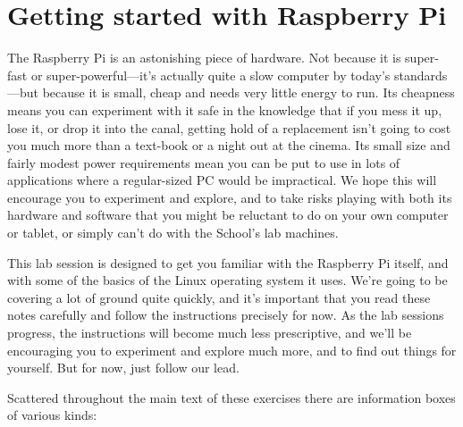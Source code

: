 \chapter{Getting started with Raspberry Pi}



The Raspberry Pi is an astonishing piece of hardware. Not because it is super-fast or super-powerful---it's actually quite a slow computer by today's standards---but because it is small, cheap and needs very little energy to run. Its cheapness means you can experiment with it safe in the knowledge that if you mess it up, lose it, or drop it into the canal, getting hold of a replacement isn't going to cost you much more than a text-book or a night out at the cinema. Its small size and fairly modest power requirements mean you can be put to use in lots of applications where a regular-sized PC would be impractical.  We hope this will encourage you to experiment and explore, and to take risks playing with both its hardware and software that you might be reluctant to do on your own computer or tablet, or simply can't do with the School's lab machines. 

This lab session is designed to get you familiar with the Raspberry Pi itself, and with some of the basics of the Linux operating system it uses. We're going to be covering a lot of ground quite quickly, and it's important that you read these notes carefully and follow the instructions precisely for now. As the lab sessions progress, the instructions will become much less prescriptive, and we'll be encouraging you to experiment and explore much more, and to find out things for yourself. But for now, just follow our lead. 

Scattered throughout the main text of these exercises there are information boxes of various kinds:
\\

